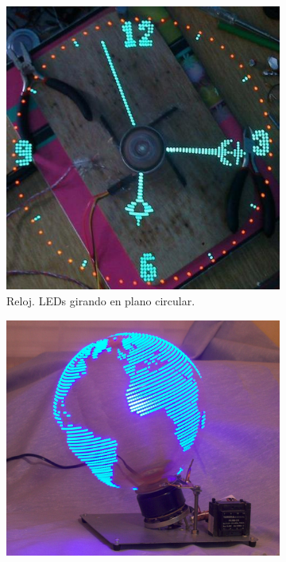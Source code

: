 \begin{figure}[!p]
	\centering
	\begin{subfigure}[t]{0.3\textwidth}
		\centering
		\includegraphics[width=\textwidth]{images/clock}
		\caption{Reloj. LEDs girando en plano circular.}
		\label{fig:clock}
	\end{subfigure}
	\hspace{0.5cm}
	\begin{subfigure}[t]{0.3\textwidth}
		\centering
		\includegraphics[width=\textwidth]{images/sphere}

\end{subfigure}
\end{figure}
